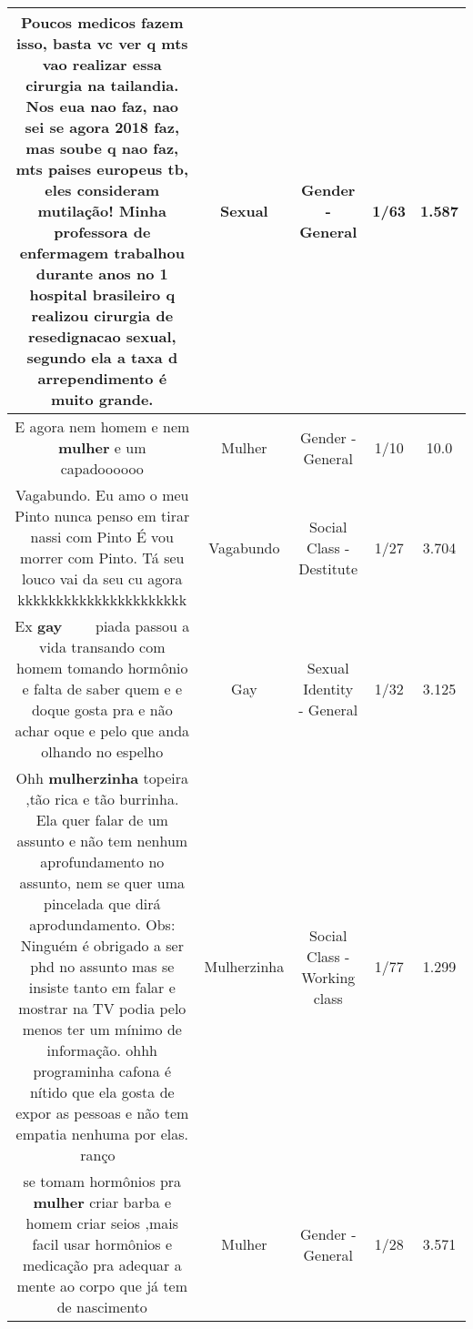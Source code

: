 \documentclass[11pt]{article}
\newlength\mylength
\begin{document}
\begin{center}
\begin{longtable}{|C{.65\mylength}|C{.30\mylength}|C{.12\mylength}|C{.12\mylength}|C{.12\mylength}|}
  \small Poucos medicos fazem isso, basta vc ver q mts vao realizar essa cirurgia na tailandia. Nos eua nao faz, nao sei se agora 2018 faz, mas soube q nao faz,  mts paises europeus tb, eles consideram mutilação! Minha professora de enfermagem trabalhou durante anos no 1 hospital  brasileiro q realizou cirurgia de resedignacao \textbf{sexual}, segundo ela a taxa d arrependimento é muito grande.\normalsize   & Sexual & Gender - General & 1/63 & 1.587 \\  \hline
  \small E agora nem homem e nem  \textbf{mulher} e um capadoooooo\normalsize   & Mulher & Gender - General & 1/10 & 10.0 \\  \hline
  \small Vagabundo.   Eu  amo  o meu  Pinto   nunca   penso   em  tirar   nassi   com Pinto   É vou  morrer   com Pinto.   Tá  seu   louco    vai   da seu cu agora  kkkkkkkkkkkkkkkkkkkkkk\normalsize   & Vagabundo & Social Class - Destitute & 1/27 & 3.704 \\  \hline
  \small Ex \textbf{gay} 🤣🤣🤣🤣🤣🤣🤣piada passou a vida transando com homem tomando hormônio e falta de saber quem e e doque gosta pra e não achar oque e pelo  que anda olhando no espelho\normalsize   & Gay & Sexual Identity - General & 1/32 & 3.125 \\  \hline
  \small Ohh \textbf{mulherzinha} topeira ,tão rica e tão burrinha. Ela quer falar de um assunto e não tem nenhum aprofundamento no assunto, nem se quer uma pincelada que dirá aprodundamento. Obs: Ninguém é obrigado a ser phd no assunto mas se insiste tanto em falar e mostrar na TV podia pelo menos ter um mínimo de informação. ohhh programinha cafona é nítido que ela gosta de expor as pessoas e não tem empatia nenhuma por elas. ranço 💩\normalsize   & Mulherzinha & Social Class - Working class & 1/77 & 1.299 \\  \hline
  \small se tomam  hormônios  pra  \textbf{mulher}  criar  barba  e homem  criar  seios  ,mais  facil usar hormônios  e medicação pra adequar  a mente ao corpo  que já tem de nascimento\normalsize   & Mulher & Gender - General & 1/28 & 3.571 \\  \hline

\end{longtable}
\end{center}
\end{document}
